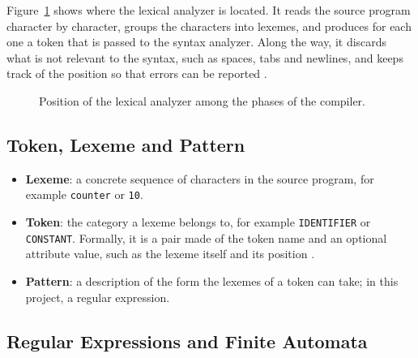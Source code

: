 \documentclass[11pt,letterpaper]{article}
\newcommand{\tok}[1]{\texttt{#1}}
\begin{document}
Figure~\ref{fig:phases} shows where the lexical analyzer is located. It reads
the source program character by character, groups the characters into
lexemes, and produces for each one a token that is passed to the syntax
analyzer. Along the way, it discards what is not relevant to the syntax, such
as spaces, tabs and newlines, and keeps track of the position so that errors
can be reported \cite{aho2006}.

\begin{figure}[H]
\centering
{}
\caption{Position of the lexical analyzer among the phases of the compiler.}
\label{fig:phases}
\end{figure}

\subsection{Token, Lexeme and Pattern}

\begin{itemize}[nosep]
  \item \textbf{Lexeme}: a concrete sequence of characters in the source
        program, for example \tok{counter} or \tok{10}.
  \item \textbf{Token}: the category a lexeme belongs to, for example
        \tok{IDENTIFIER} or \tok{CONSTANT}. Formally, it is a pair made of
        the token name and an optional attribute value, such as the lexeme
        itself and its position \cite{aho2006}.
  \item \textbf{Pattern}: a description of the form the lexemes of a token can
        take; in this project, a regular expression.
\end{itemize}

\subsection{Regular Expressions and Finite Automata}
\end{document}

